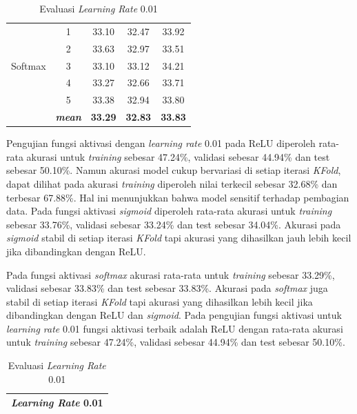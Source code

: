 \begin{table}[H]
\begin{table}[H]
\begin{tabular}{ccccc}
            \multirow{5}{*}{Softmax}
            & 1 & 33.10 & 32.47 & 33.92 \\
            & 2 & 33.63 & 32.97 & 33.51 \\
            & 3 & 33.10 & 33.12 & 34.21  \\
            & 4 & 33.27 & 32.66 & 33.71 \\
            & 5 & 33.38 & 32.94 & 33.80 \\
            & \textit{\textbf{mean}}& \textbf{33.29} & \textbf{32.83} &\textbf{33.83} \\ 
    

            \bottomrule
            \end{tabular}
            \label{Pengujian Learning Rate 0.01 }
        \end{table}

    Pengujian fungsi aktivasi dengan \textit{learning rate} 0.01 
    pada ReLU diperoleh rata-rata akurasi untuk \textit{training} sebesar 47.24\%, validasi sebesar 44.94\% dan test sebesar 50.10\%. Namun akurasi model cukup bervariasi di setiap iterasi \textit{KFold}, dapat dilihat pada akurasi \textit{training} diperoleh nilai terkecil sebesar 32.68\% dan terbesar 67.88\%.
    Hal ini menunjukkan bahwa model sensitif terhadap pembagian data. Pada fungsi aktivasi \textit{sigmoid} diperoleh rata-rata akurasi untuk \textit{training} sebesar 33.76\%, validasi sebesar 33.24\% dan test sebesar 34.04\%. Akurasi pada \textit{sigmoid} stabil di setiap iterasi \textit{KFold} tapi akurasi yang dihasilkan jauh lebih kecil jika dibandingkan dengan ReLU.
    
    Pada fungsi aktivasi \textit{softmax} akurasi rata-rata untuk \textit{training} sebesar 33.29\%, validasi sebesar 33.83\% dan test sebesar 33.83\%. Akurasi pada \textit{softmax} juga stabil di setiap iterasi \textit{KFold} tapi akurasi yang dihasilkan lebih kecil jika dibandingkan dengan ReLU dan \textit{sigmoid}. Pada pengujian fungsi aktivasi untuk \textit{learning rate} 0.01 fungsi aktivasi terbaik adalah ReLU dengan rata-rata akurasi untuk \textit{training} sebesar 47.24\%, validasi sebesar 44.94\% dan test sebesar 50.10\%.

    

        \begin{table}[H]
        \centering
        \caption{Evaluasi \textit{Learning Rate} 0.01}
        \begin{tabular}{ccccc}
            \toprule
            \multicolumn{5}{c}{\textit{Learning Rate} 0.01} \\ \hline
            

\end{tabular}
\end{table}
\end{table}
